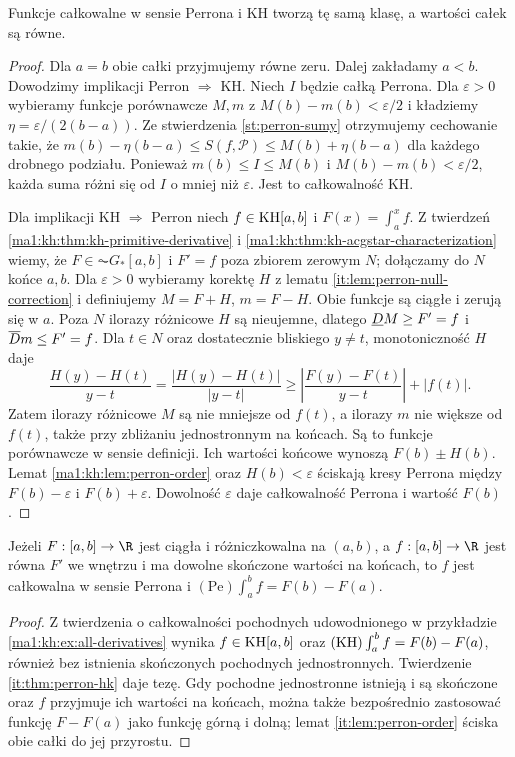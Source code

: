 \begin{twierdzenie}[Perron i KH]\label{it:thm:perron-hk}
Funkcje całkowalne w sensie Perrona i KH tworzą tę samą klasę, a wartości całek są równe.
\end{twierdzenie}
\begin{proof}
Dla $a=b$ obie całki przyjmujemy równe zeru. Dalej zakładamy $a<b$. Dowodzimy implikacji Perron $\Rightarrow$ KH. Niech $I$ będzie całką Perrona. Dla $\varepsilon>0$ wybieramy funkcje porównawcze $M,m$ z $M(b)-m(b)<\varepsilon/2$ i kładziemy $\eta=\varepsilon/(2(b-a))$. Ze stwierdzenia \ref{st:perron-sumy} otrzymujemy cechowanie takie, że
$m(b)-\eta(b-a)\le S(f,\mathcal P)\le M(b)+\eta(b-a)$
dla każdego drobnego podziału. Ponieważ $m(b)\le I\le M(b)$ i $M(b)-m(b)<\varepsilon/2$, każda suma różni się od $I$ o mniej niż $\varepsilon$. Jest to całkowalność KH.

Dla implikacji KH $\Rightarrow$ Perron niech $f\in\mathrm{KH}[a,b]$
i $F(x)=\int_a^x f$. Z twierdzeń
\ref{ma1:kh:thm:kh-primitive-derivative} i
\ref{ma1:kh:thm:kh-acgstar-characterization} wiemy, że
$F\in\AC G_*[a,b]$ i $F'=f$ poza zbiorem zerowym $N$;
dołączamy do $N$ końce $a,b$. Dla $\varepsilon>0$
wybieramy korektę $H$ z lematu \ref{it:lem:perron-null-correction}
i definiujemy $M=F+H$, $m=F-H$. Obie funkcje są ciągłe
i zerują się w $a$. Poza $N$ ilorazy różnicowe $H$ są
nieujemne, dlatego $\underline D M\ge F'=f$ i $\overline D m\le F'=f$.
Dla $t\in N$ oraz dostatecznie bliskiego $y\ne t$,
monotoniczność $H$ daje
\[
 \frac{H(y)-H(t)}{y-t}
 =\frac{|H(y)-H(t)|}{|y-t|}
 \ge \left|\frac{F(y)-F(t)}{y-t}\right|+|f(t)|.
\]
Zatem ilorazy różnicowe $M$ są nie mniejsze od $f(t)$,
a ilorazy $m$ nie większe od $f(t)$, także przy
zbliżaniu jednostronnym na końcach. Są to funkcje
porównawcze w sensie definicji. Ich wartości końcowe
wynoszą $F(b)\pm H(b)$. Lemat \ref{ma1:kh:lem:perron-order} oraz
$H(b)<\varepsilon$ ściskają kresy Perrona między
$F(b)-\varepsilon$ i $F(b)+\varepsilon$. Dowolność
$\varepsilon$ daje całkowalność Perrona i wartość $F(b)$.
\end{proof}
\begin{stwierdzenie}
Jeżeli $F:[a,b]\to\R$ jest ciągła i różniczkowalna na $(a,b)$, a $f:[a,b]\to\R$ jest równa $F'$ we wnętrzu i ma dowolne skończone wartości na końcach, to $f$ jest całkowalna w sensie Perrona i $(\mathrm{Pe})\int_a^b f=F(b)-F(a)$.
\end{stwierdzenie}
\begin{proof}
Z twierdzenia o całkowalności pochodnych udowodnionego w przykładzie \ref{ma1:kh:ex:all-derivatives} wynika $f\in\mathrm{KH}[a,b]$ oraz $(\mathrm{KH})\int_a^b f=F(b)-F(a)$, również bez istnienia skończonych pochodnych jednostronnych. Twierdzenie \ref{it:thm:perron-hk} daje tezę. Gdy pochodne jednostronne istnieją i są skończone oraz $f$ przyjmuje ich wartości na końcach, można także bezpośrednio zastosować funkcję $F-F(a)$ jako funkcję górną i dolną; lemat \ref{it:lem:perron-order} ściska obie całki do jej przyrostu.
\end{proof}
